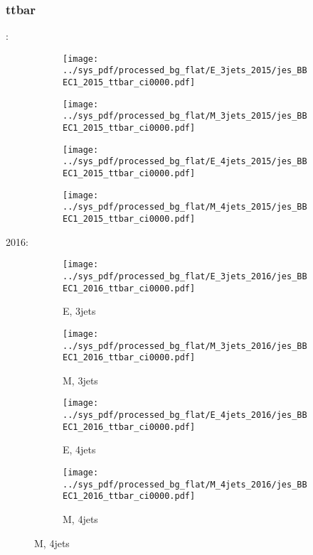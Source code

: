\documentclass{beamer}
\begin{document}
\begin{frame}
\frametitle{ttbar}
\fontsize{5}{1}:
\begin{figure}
\centering
\begin{subfigure}[b]{0.24\textwidth}
\texttt{[image: ../sys\_pdf/processed\_bg\_flat/E\_3jets\_2015/jes\_BBEC1\_2015\_ttbar\_ci0000.pdf]}
\end{subfigure}
\begin{subfigure}[b]{0.24\textwidth}
\texttt{[image: ../sys\_pdf/processed\_bg\_flat/M\_3jets\_2015/jes\_BBEC1\_2015\_ttbar\_ci0000.pdf]}
\end{subfigure}
\begin{subfigure}[b]{0.24\textwidth}
\texttt{[image: ../sys\_pdf/processed\_bg\_flat/E\_4jets\_2015/jes\_BBEC1\_2015\_ttbar\_ci0000.pdf]}
\end{subfigure}
\begin{subfigure}[b]{0.24\textwidth}
\texttt{[image: ../sys\_pdf/processed\_bg\_flat/M\_4jets\_2015/jes\_BBEC1\_2015\_ttbar\_ci0000.pdf]}
\end{subfigure}
\end{figure}
2016:
\begin{figure}
\centering
\begin{subfigure}[b]{0.24\textwidth}
\texttt{[image: ../sys\_pdf/processed\_bg\_flat/E\_3jets\_2016/jes\_BBEC1\_2016\_ttbar\_ci0000.pdf]}
\captionsetup{font=tiny}
\caption{E, 3jets}
\end{subfigure}
\begin{subfigure}[b]{0.24\textwidth}
\texttt{[image: ../sys\_pdf/processed\_bg\_flat/M\_3jets\_2016/jes\_BBEC1\_2016\_ttbar\_ci0000.pdf]}
\captionsetup{font=tiny}
\caption{M, 3jets}
\end{subfigure}
\begin{subfigure}[b]{0.24\textwidth}
\texttt{[image: ../sys\_pdf/processed\_bg\_flat/E\_4jets\_2016/jes\_BBEC1\_2016\_ttbar\_ci0000.pdf]}
\captionsetup{font=tiny}
\caption{E, 4jets}
\end{subfigure}
\begin{subfigure}[b]{0.24\textwidth}
\texttt{[image: ../sys\_pdf/processed\_bg\_flat/M\_4jets\_2016/jes\_BBEC1\_2016\_ttbar\_ci0000.pdf]}
\captionsetup{font=tiny}
\caption{M, 4jets}
\end{subfigure}
\end{figure}
\end{frame}
\end{document}
